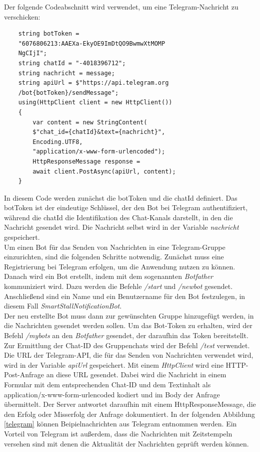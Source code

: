 \documentclass[conference]{IEEEtran}
\begin{document}
Der folgende Codeabschnitt wird verwendet, um eine Telegram-Nachricht zu verschicken:
{\small
\begin{verbatim}
	string botToken = 
	"6076806213:AAEXa-EkyOE9ImDtQO9BwmwXtMOMP
	NgCIjI";
	string chatId = "-4018396712";
	string nachricht = message;
	string apiUrl = $"https://api.telegram.org
	/bot{botToken}/sendMessage";
	using(HttpClient client = new HttpClient())
	{
		var content = new StringContent(
		$"chat_id={chatId}&text={nachricht}", 
		Encoding.UTF8, 
		"application/x-www-form-urlencoded");
		HttpResponseMessage response = 
		await client.PostAsync(apiUrl, content);
	}
\end{verbatim}
}
\newpage
In diesem Code werden zunächst die botToken und die chatId definiert. Das botToken ist der eindeutige Schlüssel, der den Bot bei Telegram authentifiziert, während die chatId die Identifikation des Chat-Kanals darstellt, in den die Nachricht gesendet wird. Die Nachricht selbst wird in der Variable \textit{nachricht} gespeichert. \\
Um einen Bot für das Senden von Nachrichten in eine Telegram-Gruppe einzurichten, sind die folgenden Schritte notwendig. Zunächst muss eine Registrierung bei Telegram erfolgen, um die Anwendung nutzen zu können. Danach wird ein Bot erstellt, indem mit dem sogenannten \textit{Botfather} kommuniziert wird. Dazu werden die Befehle \textit{/start} und \textit{/newbot} gesendet. Anschließend sind ein Name und ein Benutzername für den Bot festzulegen, in diesem Fall \textit{SmartStallNotificationBot}.\\
Der neu erstellte Bot muss dann zur gewünschten Gruppe hinzugefügt werden, in die Nachrichten gesendet werden sollen. Um das Bot-Token zu erhalten, wird der Befehl \textit{/mybots} an den \textit{Botfather} gesendet, der daraufhin das Token bereitstellt. Zur Ermittlung der Chat-ID des Gruppenchats wird der Befehl \textit{/test} verwendet.\\
Die URL der Telegram-API, die für das Senden von Nachrichten verwendet wird, wird in der Variable \textit{apiUrl} gespeichert. Mit einem \textit{HttpClient} wird eine HTTP-Post-Anfrage an diese URL gesendet. Dabei wird die Nachricht in einem Formular mit dem entsprechenden Chat-ID und dem Textinhalt als application/x-www-form-urlencoded kodiert und im Body der Anfrage übermittelt. Der Server antwortet daraufhin mit einem HttpResponseMessage, die den Erfolg oder Misserfolg der Anfrage dokumentiert. In der folgenden Abbildung \ref{telegram} können Beipielnachrichten aus Telegram entnommen werden. Ein Vorteil von Telegram ist außerdem, dass die Nachrichten mit Zeitstempeln versehen sind mit denen die Aktualität der Nachrichten geprüft werden können.
\end{document}
